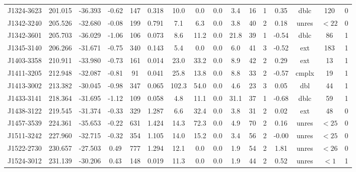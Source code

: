 \documentclass{mnras}
\begin{document}
{\begin{table*}
\begin{tabular}{cccccccccccccccc}
J1324-3623 & 201.015 & -36.393 & -0.62 & 147 & 0.318 & 10.0 & 0.0 & 0.0 & 3.4 & 16 & 1 & 0.35 & dblc & 120 & 0 \\ 

J1342-3240 & 205.526 & -32.680 & -0.08 & 199 & 0.791 & 7.1 & 6.3 & 0.0 & 3.8 & 40 & 2 & 0.18 & unres & $<22$ & 0 \\ 

J1342-3601 & 205.703 & -36.029 & -1.06 & 106 & 0.073 & 8.6 & 11.2 & 0.0 & 21.8 & 39 & 1 & -0.54 & dblc & 86 & 1 \\ 

J1345-3140 & 206.266 & -31.671 & -0.75 & 340 & 0.143 & 5.4 & 0.0 & 0.0 & 6.0 & 41 & 3 & -0.52 & ext & 183 & 1 \\ 

J1403-3358 & 210.911 & -33.980 & -0.73 & 161 & 0.014 & 23.0 & 33.2 & 0.0 & 8.9 & 42 & 2 & 0.29 & ext & 13 & 1 \\ 

J1411-3205 & 212.948 & -32.087 & -0.81 & 91 & 0.041 & 25.8 & 13.8 & 0.0 & 8.8 & 33 & 2 & -0.57 & cmplx & 19 & 1 \\ 

J1413-3002 & 213.382 & -30.045 & -0.98 & 347 & 0.065 & 102.3 & 54.0 & 0.0 & 4.6 & 23 & 3 & 0.05 & dbl & 44 & 1 \\ 

J1433-3141 & 218.364 & -31.695 & -1.12 & 109 & 0.058 & 4.8 & 11.1 & 0.0 & 31.1 & 37 & 1 & -0.68 & dblc & 59 & 1 \\ 

J1438-3122 & 219.545 & -31.374 & -0.33 & 329 & 1.287 & 6.6 & 32.4 & 0.0 & 3.8 & 31 & 2 & 0.02 & ext & 48 & 0 \\ 

J1457-3539 & 224.361 & -35.653 & -0.22 & 631 & 1.424 & 14.3 & 72.3 & 0.0 & 4.9 & 70 & 2 & 0.16 & unres & $<25$ & 0 \\ 

J1511-3242 & 227.960 & -32.715 & -0.32 & 354 & 1.105 & 14.0 & 15.2 & 0.0 & 3.4 & 56 & 2 & -0.00 & unres & $<25$ & 0 \\ 

J1522-2730 & 230.657 & -27.503 & 0.49 & 777 & 1.294 & 12.1 & 0.0 & 0.0 & 1.9 & 54 & 2 & 1.81 & unres & $<26$ & 0 \\ 

J1524-3012 & 231.139 & -30.206 & 0.43 & 148 & 0.019 & 11.3 & 0.0 & 0.0 & 1.9 & 44 & 2 & 0.52 & unres & $<1$ & 1 \\ 


\end{tabular}
\end{table*}}
\end{document}
